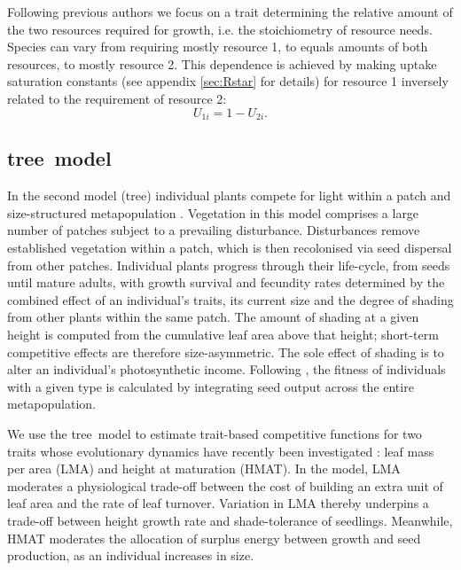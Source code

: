 \documentclass[a4paper,11pt]{article}
\newcommand{\TREE}{{\sc tree}}
\begin{document}
Following previous authors \citep{Tilman-1985, Schreiber-2003, Fox-2008} we
focus on a trait determining the relative amount of the two resources
required for growth, i.e. the stoichiometry of resource needs. Species can
vary from requiring mostly resource 1, to equals amounts of both resources, to
mostly resource 2. This dependence is achieved by making uptake saturation
constants (see appendix  \ref{sec:Rstar} for details) for resource 1 inversely related
to the requirement of resource 2:
\begin{equation}
\label{eq:R3}
U_{1i} = 1-U_{2i}.
\end{equation}

\subsection{\TREE\ model}

In the second model (\TREE) individual plants compete for light within a patch
and size-structured metapopulation \citep{Falster-2011, Falster-2015}.
Vegetation in this model comprises a large number of patches subject to a
prevailing disturbance. Disturbances remove established vegetation within a
patch, which is then recolonised via seed dispersal from other patches.
Individual plants progress through their life-cycle, from seeds until mature
adults, with growth survival and fecundity rates determined by the combined
effect of an individual's traits, its current size and the degree of shading
from other plants within the same patch. The amount of shading at a given
height is computed from the cumulative leaf area above that height; short-term
competitive effects are therefore size-asymmetric. The sole effect of shading
is to alter an individual's photosynthetic income. Following
\citep{Falster-2015}, the fitness of individuals with a given type is
calculated by integrating seed output across the entire metapopulation.

We use the \TREE\ model to estimate trait-based competitive functions for
two traits whose evolutionary dynamics have recently been investigated
\citep{Falster-2015}: leaf mass per area (LMA) and height at maturation
(HMAT). In the model, LMA moderates a physiological trade-off between the cost
of building an extra unit of leaf area and the rate of leaf turnover.
Variation in LMA thereby underpins a trade-off between height growth rate and
shade-tolerance of seedlings. Meanwhile, HMAT moderates the allocation of
surplus energy between growth and seed production, as an individual increases in
size.
\end{document}
